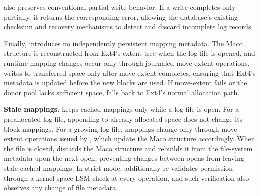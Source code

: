 \odes also preserves conventional partial-write behavior. If a write completes only partially, it returns the corresponding error, allowing the database's existing checksum and recovery mechanisms to detect and discard incomplete log records.

Finally, \odes introduces no independently persistent mapping metadata. The Maco structure is reconstructed from Ext4's extent tree when the log file is opened, and runtime mapping changes occur only through journaled move-extent operations. \odes writes to transferred space only after move-extent completes, ensuring that Ext4's metadata is updated before the new blocks are used. If move-extent fails or the donor pool lacks sufficient space, \odes falls back to Ext4's normal allocation path.



{\bf Stale mappings.}  \odes keeps cached mappings only while a log file is open. For a preallocated log file, appending to already allocated space does not change its block mappings. For a growing log file, mappings change only through move-extent operations issued by \odes, which update the Maco structure accordingly. When the file is closed, \odes discards the Maco structure and rebuilds it from the file-system metadata upon the next open, preventing changes between opens from leaving stale cached mappings. In strict mode, \odes additionally re-validates permission through a kernel-space LSM check at every operation, and such verification also observes any change of file metadata.

